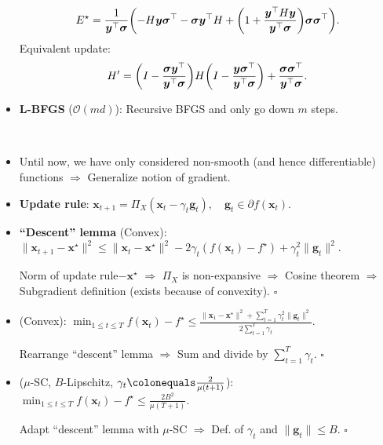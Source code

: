 \documentclass[8pt,a4paper]{extarticle}
\renewcommand{\proof}[1]{\begin{tcolorbox}#1 \hfill $\square$\end{tcolorbox}}
\newcommand{\lft}{\mathopen{}\mathclose\bgroup\left}
\newcommand{\rgt}{\aftergroup\egroup\right}
\renewcommand{\vec}[1]{\bm{#1}}
\newcommand{\mat}[1]{#1}
\newenvironment{topic}[1]
{\textbf{\sffamily \colorbox{black}{\rlap{\textbf{\textcolor{white}{#1}}}\hspace{\linewidth}\hspace{-2\fboxsep}}} \\ \vspace{0.2cm}}
{}
\begin{document}
\begin{multicols*}{2}
\begin{topic}{Quasi-Newton methods}
\begin{itemize}
\[                      \mat{E}^\star = \frac{1}{\vec{y}^\top \vec{\sigma}} \lft( - \mat{H} \vec{y} \vec{\sigma}^\top - \vec{\sigma} \vec{y}^\top \mat{H} + \lft( 1 + \frac{\vec{y}^\top \mat{H} \vec{y}}{\vec{y}^\top \vec{\sigma}} \rgt) \vec{\sigma} \vec{\sigma}^\top \rgt).
                  \]
                  Equivalent update: \[
                      \mat{H}' = \lft( \mat{I} - \frac{\vec{\sigma} \vec{y}^\top}{\vec{y}^\top \vec{\sigma}} \rgt) \mat{H} \lft( \mat{I} - \frac{\vec{y} \vec{\sigma}^\top}{\vec{y}^\top \vec{\sigma}} \rgt) + \frac{\vec{\sigma} \vec{\sigma}^\top}{\vec{y}^\top \vec{\sigma}}.
                  \]
            \item \textbf{L-BFGS} ($\mathcal{O}(md)$): Recursive BFGS and only go down $m$ steps.
        \end{itemize}
    \end{topic}

    \begin{topic}{Subgradient method}
        \begin{itemize}
            \item Until now, we have only considered non-smooth (and hence differentiable) functions $\Rightarrow$
                  Generalize notion of gradient.
            \item \textbf{Update rule}: $\vec{x}_{t+1} = \Pi_X(\vec{x}_t - \gamma_t \vec{g}_t), \quad \vec{g}_t \in \partial f(\vec{x}_t)$.
            \item \textbf{``Descent'' lemma} (Convex): $\| \vec{x}_{t+1} - \vec{x}^\star \|^2 \leq \| \vec{x}_t - \vec{x}^\star \|^2 - 2 \gamma_t (f(\vec{x}_t) - f^\star) + \gamma_t^2 \| \vec{g}_t \|^2$.
                  \proof{Norm of update rule$-\vec{x}^\star$ $\Rightarrow$ $\Pi_X$ is non-expansive $\Rightarrow$ Cosine theorem $\Rightarrow$ Subgradient definition (exists because of convexity).}
            \item (Convex): $\min_{1 \leq t \leq T} f(\vec{x}_t) - f^\star \leq \frac{\| \vec{x}_1 - \vec{x}^\star \|^2 + \sum_{t=1}^{T} \gamma_t^2 \| \vec{g}_t \|^2}{2 \sum_{t=1}^{T} \gamma_t}$.
                  \proof{Rearrange ``descent'' lemma $\Rightarrow$ Sum and divide by $\sum_{t=1}^T \gamma_t$.}
            \item ($\mu$-SC, $B$-Lipschitz, $\gamma_t \colonequals \frac{2}{\mu(t+1)}$): $\min_{1 \leq t \leq T} f(\vec{x}_t) - f^\star \leq \frac{2B^2}{\mu(T+1)}$.
                  \proof{Adapt ``descent'' lemma with $\mu$-SC $\Rightarrow$ Def. of $\gamma_t$ and $\| \vec{g}_t \| \leq B$.}
        \end{itemize}
    \end{topic}


\end{multicols*}
\end{document}
